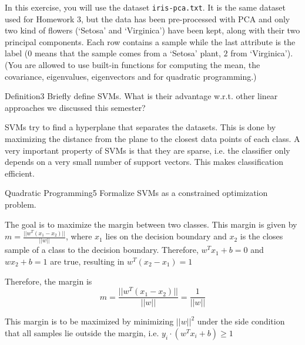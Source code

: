 \newif\ifvimbug
\vimbugfalse

\ifvimbug

\fi

In this exercise, you will use the dataset \texttt{iris-pca.txt}. It is the same dataset used for Homework 3, but the data has been pre-processed with PCA and only two kind of flowers (`Setosa' and `Virginica') have been kept, along with their two principal components. Each row contains a sample while the last attribute is the label ($0$ means that the sample comes from a `Setosa' plant, $2$ from `Virginica').
(You are allowed to use built-in functions for computing the mean, the covariance, eigenvalues, eigenvectors and for quadratic programming.)
\begin{questions}


\begin{question}{Definition}{3}
Briefly define SVMs. What is their advantage w.r.t. other linear approaches we discussed this semester? 


\begin{answer}
SVMs try to find a hyperplane that separates the datasets. This is done by maximizing the distance from the plane to the closest data points of each class. A very important property of SVMs is that they are sparse, i.e. the classifier only depends on a very small number of support vectors. This makes classification efficient.	
\end{answer}
\end{question}


\begin{question}{Quadratic Programming}{5}
Formalize SVMs as a constrained optimization problem.

\begin{answer}
The goal is to maximize the margin between two classes. This margin is given by $m=\frac{||w^T(x_1 -x_2)||}{||w||}$, where $x_1$ lies on the decision boundary and $x_2$ is the closes sample of a class to the decision boundary. Therefore, $w^T x_1 +b = 0$ and $wx_2+b=1$ are true, resulting in $w^T (x_2-x_1)= 1$

Therefore, the margin is
\[m=\frac{||w^T(x_1 -x_2)||}{||w||} = \frac{1}{||w||}
\]

This margin is to be maximized by minimizing $||w||^2$ under the side condition that all samples lie outside the margin, i.e. $y_i \cdot (w^Tx_i +b) \geq 1$


\end{answer}
\end{question}
\end{questions}
